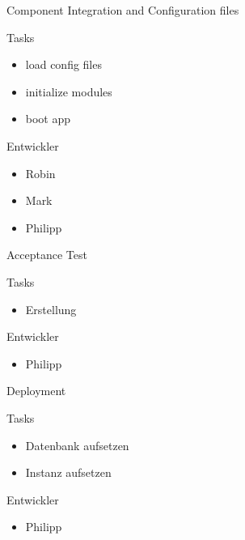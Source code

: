 \documentclass{beamer}
\begin{document}
\begin{frame}{Component Integration and Configuration files}
    \begin{block}{Tasks}
        \begin{itemize}
        \item load config files
        \item initialize modules
        \item boot app
        \end{itemize}
    \end{block}
    \begin{block}{Entwickler}
        \begin{itemize}
        \item Robin
        \item Mark
        \item Philipp
        \end{itemize}
    \end{block}

\end{frame}

\begin{frame}{Acceptance Test}
    \begin{block}{Tasks}
        \begin{itemize}
        \item Erstellung
        \end{itemize}
    \end{block}
    \begin{block}{Entwickler}
        \begin{itemize}
        \item Philipp
        \end{itemize}
    \end{block}
\end{frame}

\begin{frame}{Deployment}
    \begin{block}{Tasks}
        \begin{itemize}
        \item Datenbank aufsetzen
        \item Instanz aufsetzen
        \end{itemize}
    \end{block}
    \begin{block}{Entwickler}
        \begin{itemize}
        \item Philipp
        \end{itemize}
    \end{block}

\end{frame}
\end{document}
